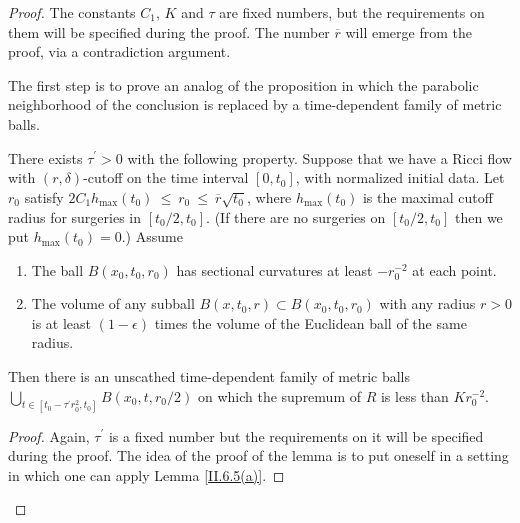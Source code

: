 \begin{proof}
The constants $C_1$, $K$ and $\tau$ are fixed numbers, but the
requirements on them will
be specified during the proof. The number $\overline{r}$ will emerge
from the proof, via a contradiction argument.

The first step is to prove an analog of the proposition in which
the parabolic neighborhood of the conclusion is replaced by
a time-dependent family of metric balls.

\begin{lemma}
  \label{lem:kl-earlier-scalar-curvature-bounds-smaller-balls-from-lower-curvature-bound-existence-scalar-curvature-6}
 \label{extra}
There exists $\tau^\prime > 0$
with the
following property. Suppose that we have a Ricci flow with $(r, \delta)$-cutoff
on the time interval $[0, t_0]$, with normalized initial data.  Let
$r_0$ satisfy
$2C_1 h_{\max}(t_0) \: \le \: r_0 \: \le \: \overline{r} \sqrt{t_0}$,
where $h_{\max}(t_0)$ is the maximal cutoff radius for surgeries in
$[t_0/2, t_0]$. (If there are no surgeries on $[t_0/2, t_0]$ then we put
$h_{\max}(t_0) = 0$.)
Assume
\begin{enumerate}
\item The ball $B(x_0, t_0, r_0)$ has sectional curvatures at least $- r_0^{-2}$
at each point.
\item The volume of any subball $B(x, t_0, r) \subset B(x_0, t_0, r_0)$ with
any radius $r > 0$ is at least $(1-\epsilon)$ times the volume of the
Euclidean ball of the same radius.
\end{enumerate}

Then there is an unscathed time-dependent family
of metric balls
$\bigcup_{t \in [t_0-\tau^\prime r_0^2, t_0]} B(x_0, t, r_0/2)$
on which the supremum of $R$ is less than $K r_0^{-2}$.
\end{lemma}
\begin{proof}
Again, $\tau^\prime$ is a fixed number but the
requirements on it will
be specified during the proof.
The idea of the proof of the lemma
is to put oneself in a setting in
which one can apply Lemma \ref{II.6.5(a)}.


\end{proof}
\end{proof}

